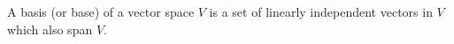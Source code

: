 A basis (or base) of a vector space $V$ is a set of linearly independent vectors in $V$ which also span $V$.
